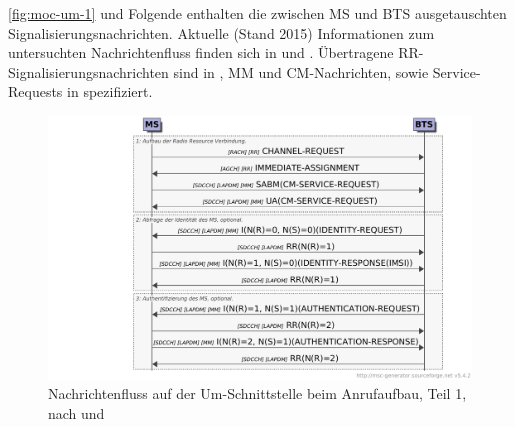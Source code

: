 \autoref{fig:moc-um-1} und Folgende enthalten die zwischen \ac{MS} und \ac{BTS} ausgetauschten Signalisierungsnachrichten. Aktuelle (Stand 2015) Informationen zum untersuchten Nachrichtenfluss finden sich in  und . Übertragene \ac{RR}-Signalisierungsnachrichten sind in , \ac{MM} und \ac{CM}-Nachrichten, sowie Service-Requests in  spezifiziert.

\begin{figure}[H]
	\centering \includegraphics[width=1.0\textwidth]{figures/mscgen/gsm_MOC_on_UM01.pdf}
	\caption[Nachrichtenfluss auf der Um-Schnittstelle beim Anrufaufbau, Teil 1]{Nachrichtenfluss auf der \ac{Um}-Schnittstelle beim Anrufaufbau, Teil 1, nach  und } \label{fig:moc-um-1}
\end{figure}

